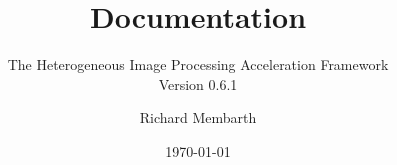 


\title{\hipacc{} Documentation}
\subtitle{The Heterogeneous Image Processing Acceleration Framework\\Version 0.6.1}
\author{Richard Membarth}
\date{\today}

\maketitle

\cleardoublepage
\tableofcontents
\cleardoublepage






\nocite{membarth2011ggc}
\nocite{membarth2012gdg}
\nocite{membarth2012aoi}
\nocite{membarth2012msv}
\cleardoublepage
\appendix





